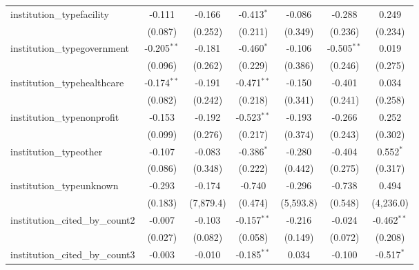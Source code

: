 \begin{tabular}{lcccccc}
   institution\_typefacility             & -0.111         & -0.166        & -0.413$^{*}$   & -0.086        & -0.288         & 0.249\\   
                                         & (0.087)        & (0.252)       & (0.211)        & (0.349)       & (0.236)        & (0.234)\\   
   institution\_typegovernment           & -0.205$^{**}$  & -0.181        & -0.460$^{*}$   & -0.106        & -0.505$^{**}$  & 0.019\\   
                                         & (0.096)        & (0.262)       & (0.229)        & (0.386)       & (0.246)        & (0.275)\\   
   institution\_typehealthcare           & -0.174$^{**}$  & -0.191        & -0.471$^{**}$  & -0.150        & -0.401         & 0.034\\   
                                         & (0.082)        & (0.242)       & (0.218)        & (0.341)       & (0.241)        & (0.258)\\   
   institution\_typenonprofit            & -0.153         & -0.192        & -0.523$^{**}$  & -0.193        & -0.266         & 0.252\\   
                                         & (0.099)        & (0.276)       & (0.217)        & (0.374)       & (0.243)        & (0.302)\\   
   institution\_typeother                & -0.107         & -0.083        & -0.386$^{*}$   & -0.280        & -0.404         & 0.552$^{*}$\\   
                                         & (0.086)        & (0.348)       & (0.222)        & (0.442)       & (0.275)        & (0.317)\\   
   institution\_typeunknown              & -0.293         & -0.174        & -0.740         & -0.296        & -0.738         & 0.494\\   
                                         & (0.183)        & (7,879.4)     & (0.474)        & (5,593.8)     & (0.548)        & (4,236.0)\\   
   institution\_cited\_by\_count2        & -0.007         & -0.103        & -0.157$^{**}$  & -0.216        & -0.024         & -0.462$^{**}$\\   
                                         & (0.027)        & (0.082)       & (0.058)        & (0.149)       & (0.072)        & (0.208)\\   
   institution\_cited\_by\_count3        & -0.003         & -0.010        & -0.185$^{**}$  & 0.034         & -0.100         & -0.517$^{*}$\\   

\end{tabular}
